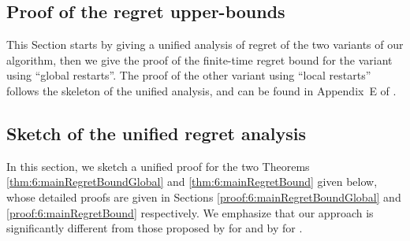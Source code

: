 \subsection{Proof of the regret upper-bounds}
\label{sec:6:proofRegret}


This Section starts by giving a unified analysis of regret of the two variants of our algorithm, then we give the proof of the finite-time regret bound for the variant using ``global restarts''.
The proof of the other variant using ``local restarts'' follows the skeleton of the unified analysis, and can be found in Appendix~E of \cite{Besson2019GLRT}.

\subsection{Sketch of the unified regret analysis}
\label{sub:6:proofSkeleton}

In this section, we sketch a unified proof for the two Theorems \ref{thm:6:mainRegretBoundGlobal} and \ref{thm:6:mainRegretBound} given below, whose detailed proofs are given in Sections \ref{proof:6:mainRegretBoundGlobal} and \ref{proof:6:mainRegretBound} respectively.
We emphasize that our approach is significantly different from those proposed by \cite{CaoZhenKvetonXie18} for \MUCB{} and by \cite{LiuLeeShroff17} for \CUSUMUCB.

